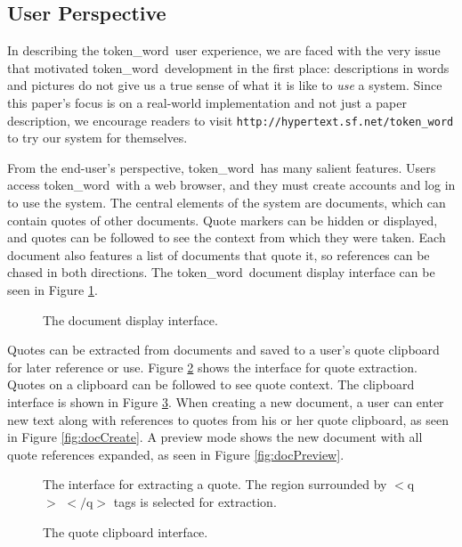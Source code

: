 \documentclass{acm_proc_article-sp}
\newcommand{\tw}{token\_word}
\begin{document}
\subsection{User Perspective}
In describing the \tw \ user experience, we are faced with the very issue that motivated \tw \ development in the first place:  descriptions in words and pictures do not give us a true sense of what it is like to {\it use} a system.
Since this paper's focus is on a real-world implementation and not just a paper description, we encourage readers to visit {\tt http://hypertext.sf.net/token\_word} to try our system for themselves. 

From the end-user's perspective, \tw \ has many sal\-ient features.
Users access \tw \ with a web browser, and they must create accounts and log in to use the system.  
The central elements of the system are documents, which can contain quotes of other documents.
Quote markers can be hidden or displayed, and quotes can be followed to see the context from which they were taken.
Each document also features a list of documents that quote it, so references can be chased in both directions.
The \tw \  document display interface can be seen in Figure \ref{fig:mainScreen}.

\begin{figure}[t]
\centering
{}
\caption{The document display interface.}
\label{fig:mainScreen}
\end{figure}  

Quotes can be extracted from documents and saved to a user's quote clipboard for later reference or use.
Figure \ref{fig:extractQuote} shows the interface for quote extraction. 
Quotes on a clipboard can be followed to see quote context.
The clipboard interface is shown in Figure \ref{fig:quoteClipboard}.
When creating a new document, a user can enter new text along with references to quotes from his or her quote clipboard, as seen in Figure \ref{fig:docCreate}.
A preview mode shows the new document with all quote references expanded, as seen in Figure \ref{fig:docPreview}.

\begin{figure}[t]
\centering
{}
\caption{The interface for extracting a quote.  The region surrounded by $<$q$>$ $<$$/$q$>$ tags is selected for extraction.}
\label{fig:extractQuote}
\end{figure}

\begin{figure}[t]
\centering
{}
\caption{The quote clipboard interface.}
\label{fig:quoteClipboard}
\end{figure}
\end{document}
